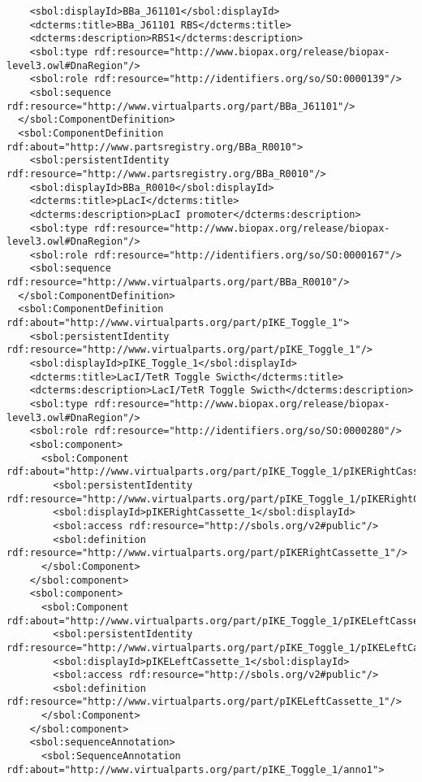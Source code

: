 \begin{lstlisting}
    <sbol:displayId>BBa_J61101</sbol:displayId>
    <dcterms:title>BBa_J61101 RBS</dcterms:title>
    <dcterms:description>RBS1</dcterms:description>
    <sbol:type rdf:resource="http://www.biopax.org/release/biopax-level3.owl#DnaRegion"/>
    <sbol:role rdf:resource="http://identifiers.org/so/SO:0000139"/>
    <sbol:sequence rdf:resource="http://www.virtualparts.org/part/BBa_J61101"/>
  </sbol:ComponentDefinition>
  <sbol:ComponentDefinition rdf:about="http://www.partsregistry.org/BBa_R0010">
    <sbol:persistentIdentity rdf:resource="http://www.partsregistry.org/BBa_R0010"/>
    <sbol:displayId>BBa_R0010</sbol:displayId>
    <dcterms:title>pLacI</dcterms:title>
    <dcterms:description>pLacI promoter</dcterms:description>
    <sbol:type rdf:resource="http://www.biopax.org/release/biopax-level3.owl#DnaRegion"/>
    <sbol:role rdf:resource="http://identifiers.org/so/SO:0000167"/>
    <sbol:sequence rdf:resource="http://www.virtualparts.org/part/BBa_R0010"/>
  </sbol:ComponentDefinition>
  <sbol:ComponentDefinition rdf:about="http://www.virtualparts.org/part/pIKE_Toggle_1">
    <sbol:persistentIdentity rdf:resource="http://www.virtualparts.org/part/pIKE_Toggle_1"/>
    <sbol:displayId>pIKE_Toggle_1</sbol:displayId>
    <dcterms:title>LacI/TetR Toggle Swicth</dcterms:title>
    <dcterms:description>LacI/TetR Toggle Swicth</dcterms:description>
    <sbol:type rdf:resource="http://www.biopax.org/release/biopax-level3.owl#DnaRegion"/>
    <sbol:role rdf:resource="http://identifiers.org/so/SO:0000280"/>
    <sbol:component>
      <sbol:Component rdf:about="http://www.virtualparts.org/part/pIKE_Toggle_1/pIKERightCassette_1">
        <sbol:persistentIdentity rdf:resource="http://www.virtualparts.org/part/pIKE_Toggle_1/pIKERightCassette_1"/>
        <sbol:displayId>pIKERightCassette_1</sbol:displayId>
        <sbol:access rdf:resource="http://sbols.org/v2#public"/>
        <sbol:definition rdf:resource="http://www.virtualparts.org/part/pIKERightCassette_1"/>
      </sbol:Component>
    </sbol:component>
    <sbol:component>
      <sbol:Component rdf:about="http://www.virtualparts.org/part/pIKE_Toggle_1/pIKELeftCassette_1">
        <sbol:persistentIdentity rdf:resource="http://www.virtualparts.org/part/pIKE_Toggle_1/pIKELeftCassette_1"/>
        <sbol:displayId>pIKELeftCassette_1</sbol:displayId>
        <sbol:access rdf:resource="http://sbols.org/v2#public"/>
        <sbol:definition rdf:resource="http://www.virtualparts.org/part/pIKELeftCassette_1"/>
      </sbol:Component>
    </sbol:component>
    <sbol:sequenceAnnotation>
      <sbol:SequenceAnnotation rdf:about="http://www.virtualparts.org/part/pIKE_Toggle_1/anno1">

\end{lstlisting}
